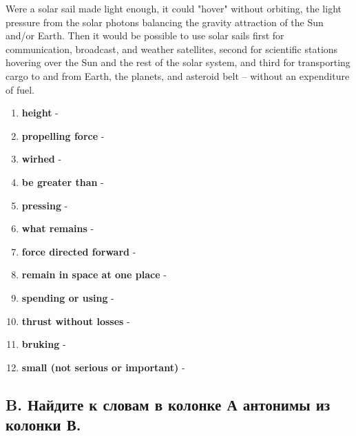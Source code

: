 Were a solar sail made light enough, it could "hover" without orbiting, the light pressure from the solar photons balancing the gravity attraction of the Sun and/or Earth. Then it would be possible to use solar sails first for communication, broadcast, and weather satellites, second for scientific stations hovering over the Sun and the rest of the solar system, and third for transporting cargo to and from Earth, the planets, and asteroid belt -- without an expenditure of fuel.


\begin{enumerate}
      \item \textbf{height} - \underline{\hspace{2cm}}
      \item \textbf{propelling force} - \underline{\hspace{2cm}}
      \item \textbf{wirhed} - \underline{\hspace{2cm}}
      \item \textbf{be greater than} - \underline{\hspace{2cm}}
      \item \textbf{pressing} - \underline{\hspace{2cm}}
      \item \textbf{what remains} - \underline{\hspace{2cm}}
      \item \textbf{force directed forward} - \underline{\hspace{2cm}}
      \item \textbf{remain in space at one place} - \underline{\hspace{2cm}}
      \item \textbf{spending or using} - \underline{\hspace{2cm}}
      \item \textbf{thrust without losses} - \underline{\hspace{2cm}}
      \item \textbf{bruking} - \underline{\hspace{2cm}}
      \item \textbf{small (not serious or important)} - \underline{\hspace{2cm}}
\end{enumerate}

\subsection*{B. Найдите к словам в колонке А антонимы из колонки В.}

